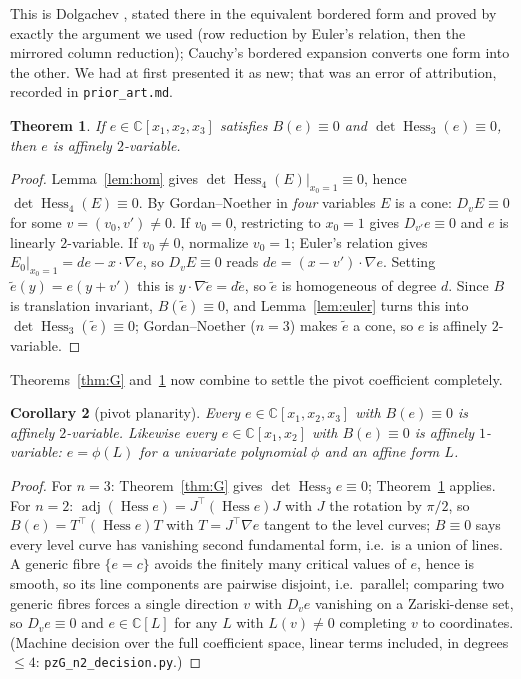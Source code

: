 \documentclass[11pt]{article}
\theoremstyle{plain}
\newtheorem{theorem}{Theorem}[section]
\newtheorem{corollary}[theorem]{Corollary}
\theoremstyle{definition}
\newcommand{\C}{\mathbb{C}}
\newcommand{\Hess}{\operatorname{Hess}}
\newcommand{\adj}{\operatorname{adj}}
\begin{document}
This is Dolgachev \cite[\S1.1.4, (1.20)--(1.21)]{Dolgachev}, stated there in
the equivalent bordered form and proved by exactly the argument we used
(row reduction by Euler's relation, then the mirrored column reduction);
Cauchy's bordered expansion converts one form into the other. We had at
first presented it as new; that was an error of attribution, recorded in
\texttt{prior\_art.md}.

\begin{theorem}\label{thm:F}
If $e\in\C[x_1,x_2,x_3]$ satisfies $B(e)\equiv0$ and
$\det\Hess_3(e)\equiv0$, then $e$ is affinely $2$-variable.
\end{theorem}

\begin{proof}
Lemma~\ref{lem:hom} gives $\det\Hess_4(E)|_{x_0=1}\equiv0$, hence
$\det\Hess_4(E)\equiv0$. By Gordan--Noether in \emph{four} variables $E$ is
a cone: $D_vE\equiv0$ for some $v=(v_0,v')\ne0$. If $v_0=0$, restricting to
$x_0=1$ gives $D_{v'}e\equiv0$ and $e$ is linearly $2$-variable. If
$v_0\ne0$, normalize $v_0=1$; Euler's relation gives
$E_0|_{x_0=1}=de-x\!\cdot\!\nabla e$, so $D_vE\equiv0$ reads
$de=(x-v')\!\cdot\!\nabla e$. Setting $\tilde e(y)=e(y+v')$ this is
$y\!\cdot\!\nabla\tilde e=d\tilde e$, so $\tilde e$ is homogeneous of
degree $d$. Since $B$ is translation invariant, $B(\tilde e)\equiv0$, and
Lemma~\ref{lem:euler} turns this into $\det\Hess_3(\tilde e)\equiv0$;
Gordan--Noether ($n=3$) makes $\tilde e$ a cone, so $e$ is affinely
$2$-variable.
\end{proof}

Theorems~\ref{thm:G} and~\ref{thm:F} now combine to settle the pivot
coefficient completely.

\begin{corollary}[pivot planarity]\label{cor:E}
Every $e\in\C[x_1,x_2,x_3]$ with $B(e)\equiv0$ is affinely $2$-variable.
Likewise every $e\in\C[x_1,x_2]$ with $B(e)\equiv0$ is affinely
$1$-variable: $e=\phi(L)$ for a univariate polynomial $\phi$ and an affine
form $L$.
\end{corollary}

\begin{proof}
For $n=3$: Theorem~\ref{thm:G} gives $\det\Hess_3e\equiv0$;
Theorem~\ref{thm:F} applies. For $n=2$: $\adj(\Hess e)=J^\top(\Hess e)J$
with $J$ the rotation by $\pi/2$, so $B(e)=T^\top(\Hess e)T$ with
$T=J^\top\nabla e$ tangent to the level curves; $B\equiv0$ says every
level curve has vanishing second fundamental form, i.e.\ is a union of
lines. A generic fibre $\{e=c\}$ avoids the finitely many critical values
of $e$, hence is smooth, so its line components are pairwise disjoint,
i.e.\ parallel; comparing two generic fibres forces a single direction
$v$ with $D_ve$ vanishing on a Zariski-dense set, so $D_ve\equiv0$ and
$e\in\C[L]$ for any $L$ with $L(v)\ne0$ completing $v$ to coordinates.
(Machine decision over the full coefficient space, linear terms included,
in degrees $\le4$: \texttt{pzG\_n2\_decision.py}.)
\end{proof}
\end{document}
